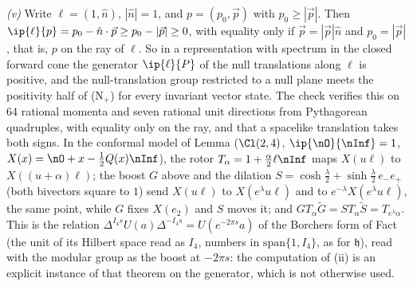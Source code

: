 \emph{(v)} Write $\ell = (1, \hat n)$, $|\hat n| = 1$, and $p = (p_{0}, \vec p)$ with $p_{0} \ge |\vec p|$. Then $\ip{\ell}{p} = p_{0} - \hat n\cdot\vec p \ge p_{0} - |\vec p| \ge 0$, with equality only if $\vec p = |\vec p|\hat n$ and $p_{0} = |\vec p|$, that is, $p$ on the ray of $\ell$. So in a representation with spectrum in the closed forward cone the generator $\ip{\ell}{P}$ of the null translations along $\ell$ is positive, and the null-translation group restricted to a null plane meets the positivity half of (N$_{+}$) for every invariant vector state. The check verifies this on 64 rational momenta and seven rational unit directions from Pythagorean quadruples, with equality only on the ray, and that a spacelike translation takes both signs. In the conformal model of Lemma  ($\Cl(2,4)$, $\ip{\nO}{\nInf} = 1$, $X(x) = \nO + x - \tfrac12 Q(x)\nInf$), the rotor $T_{\alpha} = 1 + \tfrac{\alpha}{2}\ell\nInf$ maps $X(u\ell)$ to $X((u + \alpha)\ell)$; the boost $G$ above and the dilation $S = \cosh\tfrac{\lambda}{2} + \sinh\tfrac{\lambda}{2}\,e_{-}e_{+}$ (both bivectors square to $1$) send $X(u\ell)$ to $X(e^{\lambda}u\ell)$ and to $e^{-\lambda}X(e^{\lambda}u\ell)$, the same point, while $G$ fixes $X(e_{2})$ and $S$ moves it; and $GT_{\alpha}\tilde G = ST_{\alpha}\tilde S = T_{e^{\lambda}\alpha}$. This is the relation $\Delta^{I_{4}s}U(a)\Delta^{-I_{4}s} = U(e^{-2\pi s}a)$ of the Borchers form of Fact  (the unit of its Hilbert space read as $I_{4}$, numbers in $\mathrm{span}\{1, I_{4}\}$, as for $\mathfrak{h}$), read with the modular group as the boost at $-2\pi s$: the computation of (ii) is an explicit instance of that theorem on the generator, which is not otherwise used.

